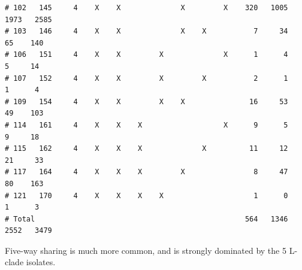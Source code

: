 \documentclass{article}\usepackage[]{graphicx}\usepackage[]{color}
\makeatletter
\newenvironment{kframe}{%
 \def\at@end@of@kframe{}%
 \ifinner\ifhmode%
  \def\at@end@of@kframe{\end{minipage}}%
  \begin{minipage}{\columnwidth}%
 \fi\fi%
 \def\FrameCommand##1{\hskip\@totalleftmargin \hskip-\fboxsep
 \colorbox{shadecolor}{##1}\hskip-\fboxsep
     \hskip-\linewidth \hskip-\@totalleftmargin \hskip\columnwidth}%
 \MakeFramed {\advance\hsize-\width
   \@totalleftmargin\z@ \linewidth\hsize
   \@setminipage}}%
 {\par\unskip\endMakeFramed%
 \at@end@of@kframe}
\newenvironment{knitrout}{}{} %
\makeatother
\begin{document}
\begin{knitrout}
\begin{kframe}
\begin{verbatim}
# 102   145     4    X    X              X         X    320   1005   1973   2585
# 103   146     4    X    X              X    X           7     34     65    140
# 106   151     4    X    X         X              X      1      4      5     14
# 107   152     4    X    X         X         X           2      1      1      4
# 109   154     4    X    X         X    X               16     53     49    103
# 114   161     4    X    X    X                   X      9      5      9     18
# 115   162     4    X    X    X              X          11     12     21     33
# 117   164     4    X    X    X         X                8     47     80    163
# 121   170     4    X    X    X    X                     1      0      1      3
# Total                                                 564   1346   2552   3479
\end{verbatim}
\end{kframe}
\end{knitrout}

Five-way sharing is much more common, and is strongly dominated by the 5 L-clade isolates.
\end{document}
